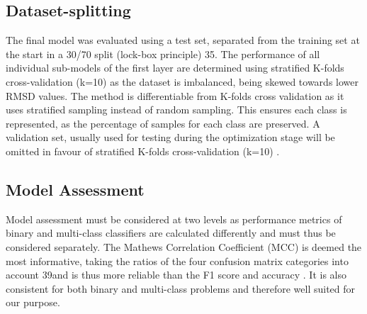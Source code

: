 \documentclass[preprint,12pt]{elsarticle}
\begin{document}
\subsection{Dataset-splitting}
 The final model was evaluated using a test set, separated from the training set at the start in a 30/70 split (lock-box principle) 35. The performance of all individual sub-models of the first layer are determined using stratified K-folds cross-validation (k=10) as the dataset is imbalanced, being skewed towards lower RMSD values. The method is differentiable from K-folds cross validation as it uses stratified sampling instead of random sampling. This ensures each class is represented, as the percentage of samples for each class are preserved. 
A validation set, usually used for testing during the optimization stage will be omitted in favour of stratified K-folds cross-validation (k=10) \cite{Krstajic2014} \cite{Kohavi1995}.

\subsection{Model Assessment} 
Model assessment must be considered at two levels as performance metrics of binary and multi-class classifiers are calculated differently and must thus be considered separately. The Mathews Correlation Coefficient (MCC) \cite{Matthews1975} is deemed the most informative, taking the ratios of the four confusion matrix categories into account 39and is thus more reliable than the F1 score and accuracy . It is also consistent for both binary and multi-class problems and therefore well suited for our purpose.
 
\end{document}
